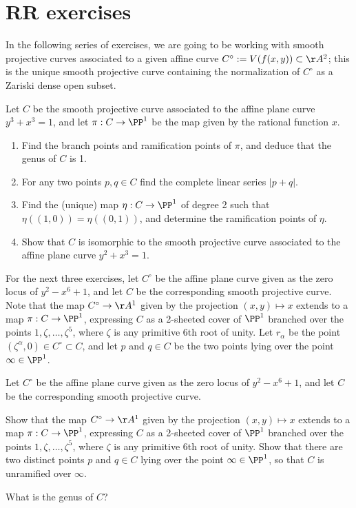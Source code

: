 
 
\chapter{RR exercises}\label{RR exercises}


In the following series of exercises, we are going to be working with smooth projective curves associated to a given affine curve $C^\circ := V(f(x,y)) \subset \AA^2$; this is the unique smooth projective curve containing the normalization of $C^\circ$ as a Zariski dense open subset.

\begin{exercise}
Let $C$ be the smooth projective curve associated to the affine plane curve $y^3 +x^3 = 1$, and let $\pi : C \to \PP^1$ be the map given by the rational function $x$.
\begin{enumerate}
\item Find the branch points and ramification points of $\pi$, and deduce that the genus of $C$ is 1.
\item For any two points $p, q \in C$ find the complete linear series $|p+q|$.
\item Find the (unique) map $\eta : C \to \PP^1$ of degree 2 such that $\eta((1,0)) = \eta((0,1))$, and determine the ramification points of $\eta$.
\item Show that $C$ is isomorphic to the smooth projective curve associated to the affine plane curve $y^2 +x^3 = 1$.
\end{enumerate}
\end{exercise}

For the next three exercises, let $C^\circ$ be the affine plane curve given as the zero locus of $y^2 - x^6 +1$, and let $C$ be the corresponding smooth projective curve. Note that the map $C^\circ \to \AA^1$ given by the projection $(x,y) \mapsto x$ extends to a map $\pi : C \to \PP^1$, expressing $C$ as a 2-sheeted cover of $\PP^1$ branched over the points $1, \zeta, \dots, \zeta^5$, where $\zeta$ is any primitive 6th root of unity. Let $r_\alpha$ be the point $(\zeta^\alpha, 0) \in C^\circ \subset C$, and  let $p$ and $q \in C$ be the two points lying over the point $\infty \in \PP^1$.

\begin{exercise}\label{hyperelliptic curve 1}
Let $C^\circ$ be the affine plane curve given as the zero locus of $y^2 - x^6 +1$, and let $C$ be the corresponding smooth projective curve. 

Show  that the map $C^\circ \to \AA^1$ given by the projection $(x,y) \mapsto x$ extends to a map $\pi : C \to \PP^1$, expressing $C$ as a 2-sheeted cover of $\PP^1$ branched over the points $1, \zeta, \dots, \zeta^5$, where $\zeta$ is any primitive 6th root of unity. Show that there are two distinct points $p$ and $q \in C$  lying over the point $\infty \in \PP^1$,
so that $C$ is unramified over $\infty$.

What is the genus of $C$?
\end{exercise}

